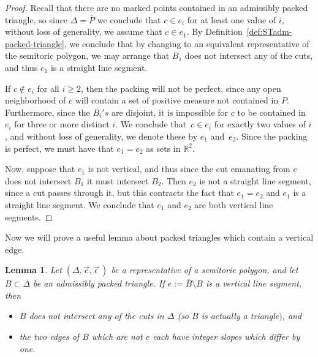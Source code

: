\documentclass[pdftex]{sigma}
\numberwithin{equation}{section}
\newtheorem{Lemma}[Theorem]{Lemma}
\def\R{{\mathbb R}}
\newcommand{\De}{\Delta}
\newcommand{\strep}{(\De,\vec{c},\vec{\epsilon}\,)}
\begin{document}
\begin{proof}
 Recall that there are no marked points contained in an admissibly packed triangle, so since $\De = \overline{P}$ we conclude that $c\in e_i$ for at least one value of $i$, without loss of generality, we assume that $c\in e_1$.
 By Definition~\ref{def:STadm-packed-triangle}, we conclude that by changing to an equivalent representative of the semitoric polygon, we may arrange that $B_1$ does not intersect any of the cuts, and thus $e_1$ is a straight line segment.

 If $c\notin e_i$ for all $i\geq 2$, then the packing will not be perfect, since any open neighborhood of $c$ will contain a set of positive measure not contained in $P$. Furthermore, since the $B_i's$ are disjoint, it is impossible for $c$ to be contained in $e_i$ for three or more distinct $i$. We conclude that~$c\in e_i$ for exactly two values of $i$, and without loss of generality, we denote these by $e_1$ and~$e_2$. Since the packing is perfect, we must have that $e_1=e_2$ as sets in $\R^2$.

 Now, suppose that $e_1$ is not vertical, and thus since the cut emanating from $c$ does not intersect $B_1$ it must intersect $B_2$. Then $e_2$ is not a straight line segment, since a cut passes through it, but this contracts the fact that $e_1=e_2$ and $e_1$ is a straight line segment. We conclude that $e_1$ and $e_2$ are both vertical line segments.
\end{proof}

Now we will prove a useful lemma about packed triangles which contain a vertical edge.

\begin{Lemma}\label{lemma:slope}
Let $\strep$ be a representative of a semitoric polygon, and let $B\subset\De$ be an admissibly packed triangle.
If $e:= \overline{B}\setminus B$ is a vertical line segment, then
\begin{itemize}\itemsep=0pt
 \item $B$ does not intersect any of the cuts in $\De$ {\rm (}so $B$ is actually a triangle$)$, and
 \item the two edges of $B$ which are not $e$ each have integer slopes which differ by one.
\end{itemize}
\end{Lemma}
\end{document}
